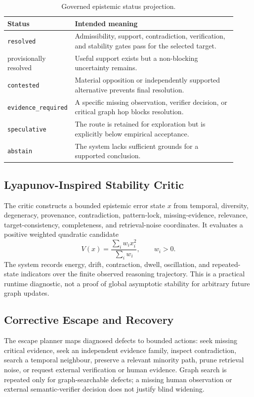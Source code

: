 \documentclass[10pt]{article}
\newcommand{\code}[1]{\texttt{#1}}
\begin{document}
\begin{table}[t]
\centering
\caption{Governed epistemic status projection.}
\label{tab:status}
\begin{tabular}{p{0.22\linewidth}p{0.70\linewidth}}
\toprule
Status & Intended meaning \\
\midrule
\code{resolved} & Admissibility, support, contradiction, verification, and stability gates pass for the selected target. \\
provisionally resolved & Useful support exists but a non-blocking uncertainty remains. \\
\code{contested} & Material opposition or independently supported alternative prevents final resolution. \\
\code{evidence\_required} & A specific missing observation, verifier decision, or critical graph hop blocks resolution. \\
\code{speculative} & The route is retained for exploration but is explicitly below empirical acceptance. \\
\code{abstain} & The system lacks sufficient grounds for a supported conclusion. \\
\bottomrule
\end{tabular}
\end{table}

\subsection{Lyapunov-Inspired Stability Critic}
The critic constructs a bounded epistemic error state $x$ from temporal, diversity, degeneracy, provenance, contradiction, pattern-lock, missing-evidence, relevance, target-consistency, completeness, and retrieval-noise coordinates. It evaluates a positive weighted quadratic candidate
\[
V(x)=\frac{\sum_i w_i x_i^2}{\sum_i w_i}, \qquad w_i>0.
\]
The system records energy, drift, contraction, dwell, oscillation, and repeated-state indicators over the finite observed reasoning trajectory. This is a practical runtime diagnostic, not a proof of global asymptotic stability for arbitrary future graph updates.

\subsection{Corrective Escape and Recovery}
The escape planner maps diagnosed defects to bounded actions: seek missing critical evidence, seek an independent evidence family, inspect contradiction, search a temporal neighbour, preserve a relevant minority path, prune retrieval noise, or request external verification or human evidence. Graph search is repeated only for graph-searchable defects; a missing human observation or external semantic-verifier decision does not justify blind widening.
\end{document}
